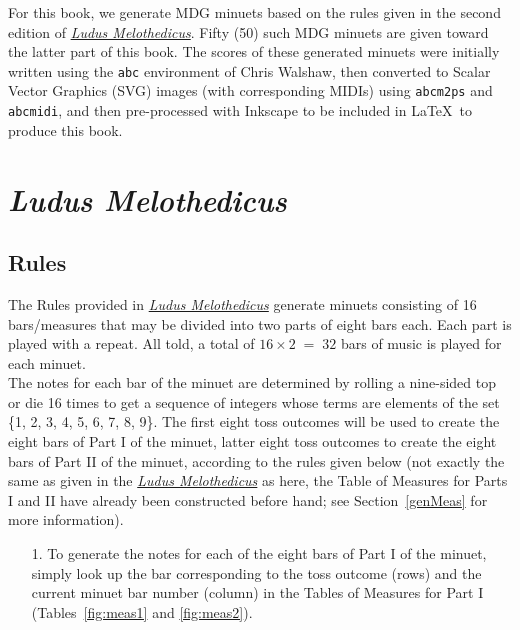 \documentclass[a4paper,x11names,svgnames,10pt]{article}
\begin{document}
{For this book, we generate MDG minuets based on the rules given in the second edition of \href{https://imslp.org/wiki/Ludus_Melothedicus_(Anonymous)}{{\em Ludus Melothedicus}}.  Fifty (50) such MDG minuets are given toward the latter part of this book. The scores of these generated minuets were initially written using the \texttt{abc} environment of Chris Walshaw, then converted to Scalar Vector Graphics (SVG) images (with corresponding MIDIs) using {\tt abcm2ps} and {\tt abcmidi}, and then pre-processed with Inkscape to be included in \LaTeX\ to produce this book.


\section{\em Ludus Melothedicus}

\subsection{Rules}\label{mdgRules}

The Rules provided in \href{https://imslp.org/wiki/Ludus_Melothedicus_(Anonymous)}{{\em Ludus Melothedicus}} generate minuets consisting of 16 bars/measures that may be divided into two parts of eight bars each. Each part is played with a repeat. All told, a total of $16 \times 2 \;=\; 32$ bars of music is played for each minuet. \\

The notes for each bar of the minuet are determined by rolling a nine-sided top or die 16 times to get a sequence of integers whose terms are elements of the set \{1, 2, 3, 4, 5, 6, 7, 8, 9\}. The first eight toss outcomes will be used to create the eight bars of Part I of the minuet, latter eight toss outcomes to create the eight bars of Part II of the minuet, according to the rules given below (not exactly the same as given in the \href{https://imslp.org/wiki/Ludus_Melothedicus_(Anonymous)}{{\em Ludus Melothedicus}} as here, the Table of Measures for Parts I and II have already been constructed before hand; see Section~\ref*{genMeas} for more information). 

\begin{enumerate}
	\item [1.\label{step1}] To generate the notes for each of the eight bars of Part I of the minuet, simply look up the bar corresponding to the toss outcome (rows) and the current minuet bar number (column) in the Tables of Measures for Part I (Tables~\ref{fig:meas1} and \ref{fig:meas2}).  
	

\end{enumerate}}
\end{document}

